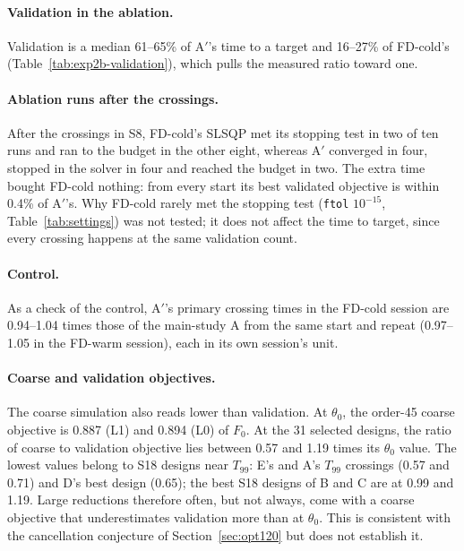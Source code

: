 \documentclass{anvil-paper}
\begin{document}
\paragraph{Validation in the ablation.}
Validation is a median 61--65\% of A$'$'s time to
a target and 16--27\% of FD-cold's (Table~\ref{tab:exp2b-validation}), which
pulls the measured ratio toward one.

\paragraph{Ablation runs after the crossings.}
After the crossings in S8, FD-cold's SLSQP met its stopping test in two of ten runs and ran to the
budget in the other eight, whereas A$'$ converged in four, stopped in the
solver in four and reached the budget in two. The extra time bought FD-cold
nothing: from every start its best validated objective is within 0.4\% of
A$'$'s. Why FD-cold rarely met the stopping test (\texttt{ftol} $10^{-15}$,
Table~\ref{tab:settings}) was not tested; it does not affect the time to
target, since every crossing happens at the same validation count.

\paragraph{Control.}
As a check of the control,
A$'$'s primary crossing times in the FD-cold session are 0.94--1.04 times those
of the main-study A from the same start and repeat (0.97--1.05 in the
FD-warm session), each in its own session's unit.

\paragraph{Coarse and validation objectives.}
The coarse simulation also reads lower than validation. At $\theta_0$, the
order-45 coarse objective is 0.887 (L1) and 0.894 (L0) of $F_0$. At the
31 selected designs, the ratio of coarse to validation objective lies
between 0.57 and 1.19 times its $\theta_0$ value. The lowest values belong
to S18 designs near $T_{99}$: E's and A's $T_{99}$ crossings (0.57 and
0.71) and D's best design (0.65); the best S18 designs of B and C are at
0.99 and 1.19. Large reductions therefore often, but not always, come with a
coarse objective that underestimates validation more than at $\theta_0$.
This is consistent with the cancellation conjecture of
Section~\ref{sec:opt120} but does not establish it.
\end{document}
